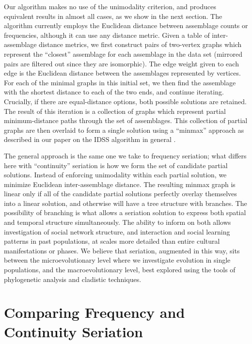 \documentclass[graybox,natbib]{svmult}
\begin{document}
Our algorithm makes no use of the unimodality criterion, and produces
equivalent results in almost all cases, as we show in the next section.
The algorithm currently employs the Euclidean distance between
assemblage counts or frequencies, although it can use any distance
metric. Given a table of inter-assemblage distance metrics, we first
construct pairs of two-vertex graphs which represent the ``closest''
assemblage for each assemblage in the data set (mirrored pairs are
filtered out since they are isomorphic). The edge weight given to each
edge is the Euclidean distance between the assemblages represented by
vertices. For each of the minimal graphs in this initial set, we then
find the assemblage with the shortest distance to each of the two ends,
and continue iterating. Crucially, if there are equal-distance options,
both possible solutions are retained. The result of this iteration is a
collection of graphs which represent partial minimum-distance paths
through the set of assemblages. This collection of partial graphs are
then overlaid to form a single solution using a ``minmax'' approach as
described in our paper on the IDSS algorithm in general
\citep{lipomadsendunnell2015}.

The general approach is the same one we take to frequency seriation;
what differs here with ``continuity'' seriation is how we form the set
of candidate partial solutions. Instead of enforcing unimodality within
each partial solution, we minimize Euclidean inter-assemblage distance.
The resulting minmax graph is linear only if all of the candidate
partial solutions perfectly overlay themselves into a linear solution,
and otherwise will have a tree structure with branches. The possibility
of branching is what allows a seriation solution to express both spatial
and temporal structure simultaneously. The ability to inform on both
allows investigation of social network structure, and interaction and
social learning patterns in past populations, at scales more detailed
than entire cultural manifestations or phases. We believe that
seriation, augmented in this way, sits between the microevolutionary
level where we investigate evolution in single populations, and the
macroevolutionary level, best explored using the tools of phylogenetic
analysis and cladistic techniques.

\section{Comparing Frequency and Continuity
Seriation}\label{comparing-frequency-and-continuity-seriation}
\end{document}
